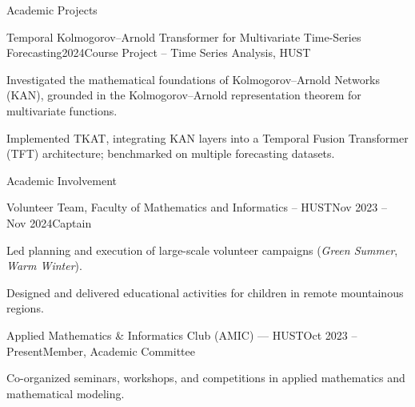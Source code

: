 \documentclass[
a4paper,
12pt,
]{resume}
\begin{document}
\begin{rSection}{Academic Projects}
\begin{rSubsection}
        \end{rSubsection}
        
        \begin{rSubsection}{Temporal Kolmogorov--Arnold Transformer for Multivariate Time-Series Forecasting}{2024}{Course Project -- Time Series Analysis, HUST}{}
            \item Investigated the mathematical foundations of Kolmogorov--Arnold Networks (KAN),
            grounded in the Kolmogorov--Arnold representation theorem for multivariate functions.
            \item Implemented TKAT, integrating KAN layers into a Temporal Fusion Transformer
            (TFT) architecture; benchmarked on multiple forecasting datasets.
        \end{rSubsection}
        
    \end{rSection}
    
    
    \begin{rSection}{Academic Involvement}
        \begin{rSubsection}{Volunteer Team, Faculty of Mathematics and Informatics -- HUST}{Nov 2023 -- Nov 2024}{Captain}{}
            \item Led planning and execution of large-scale volunteer campaigns
            (\textit{Green Summer}, \textit{Warm Winter}).
            \item Designed and delivered educational activities for children in remote
            mountainous regions.
        \end{rSubsection}
        
        \begin{rSubsection}{Applied Mathematics \& Informatics Club (AMIC) --- HUST}{Oct 2023 -- Present}{Member, Academic Committee}{}
            \item Co-organized seminars, workshops, and competitions in applied mathematics
            and mathematical modeling.
        \end{rSubsection}
        
    \end{rSection}
    
    
\end{document}
